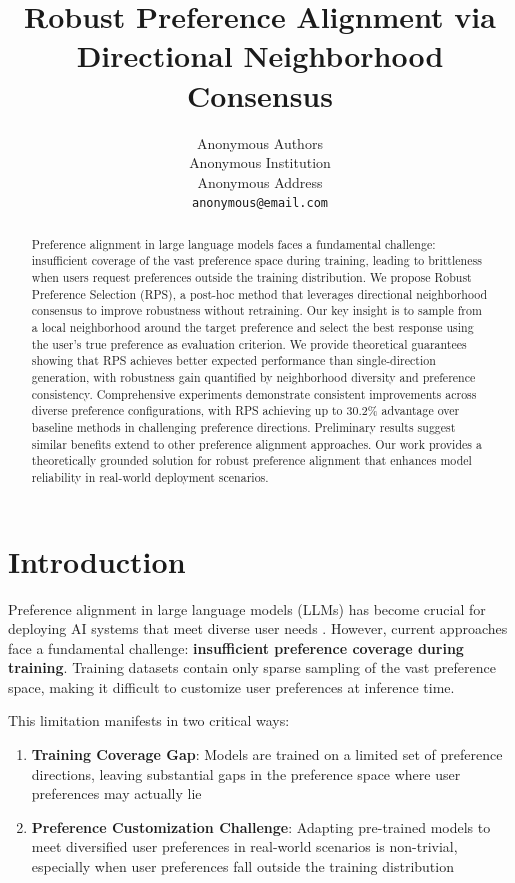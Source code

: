 \documentclass{article} %
\title{Robust Preference Alignment via Directional Neighborhood Consensus}
\author{Anonymous Authors \\
Anonymous Institution \\
Anonymous Address \\
\texttt{anonymous@email.com}
}
\begin{document}
\maketitle

\begin{abstract}
Preference alignment in large language models faces a fundamental challenge: insufficient coverage of the vast preference space during training, leading to brittleness when users request preferences outside the training distribution. We propose Robust Preference Selection (RPS), a post-hoc method that leverages directional neighborhood consensus to improve robustness without retraining. Our key insight is to sample from a local neighborhood around the target preference and select the best response using the user's true preference as evaluation criterion. We provide theoretical guarantees showing that RPS achieves better expected performance than single-direction generation, with robustness gain quantified by neighborhood diversity and preference consistency. Comprehensive experiments demonstrate consistent improvements across diverse preference configurations, with RPS achieving up to 30.2\% advantage over baseline methods in challenging preference directions. Preliminary results suggest similar benefits extend to other preference alignment approaches. Our work provides a theoretically grounded solution for robust preference alignment that enhances model reliability in real-world deployment scenarios.
\end{abstract}

\section{Introduction}

Preference alignment in large language models (LLMs) has become crucial for deploying AI systems that meet diverse user needs \cite{goodfellow2016deep}. However, current approaches face a fundamental challenge: \textbf{insufficient preference coverage during training}. Training datasets contain only sparse sampling of the vast preference space, making it difficult to customize user preferences at inference time.

This limitation manifests in two critical ways:
\begin{enumerate}
    \item \textbf{Training Coverage Gap}: Models are trained on a limited set of preference directions, leaving substantial gaps in the preference space where user preferences may actually lie
    \item \textbf{Preference Customization Challenge}: Adapting pre-trained models to meet diversified user preferences in real-world scenarios is non-trivial, especially when user preferences fall outside the training distribution
\end{enumerate}
\end{document}
